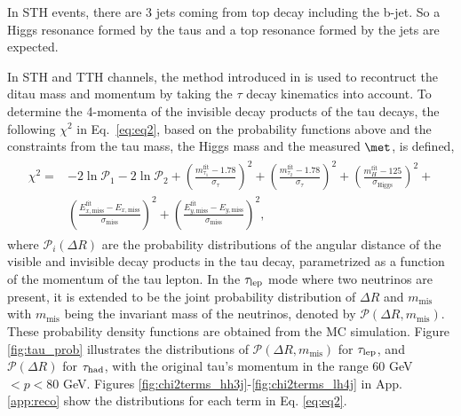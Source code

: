 In STH events, there are 3 jets coming from top decay including the b-jet. So a Higgs resonance formed by the taus and a top resonance formed by the jets are expected.

In STH and TTH channels, the method introduced in \cite{fcnc_PRD} is used to recontruct the ditau mass and momentum by taking the $\tau$ decay kinematics into account. To determine the 4-momenta of the invisible decay products of the tau decays, the following $\chi^2$ in Eq.~\ref{eq:eq2}, based on the probability functions above and the constraints from the tau mass, the Higgs mass and the measured $\met$, is defined,
\begin{eqnarray}
\begin{array}{ll}
\chi^2 = & -2\ln \mathcal{P}_1 -2\ln \mathcal{P}_2 + \left( \frac{m_{\tau_1}^{\text{fit}} - 1.78}{\sigma_{\tau}} \right)^2 +  \left( \frac{m_{\tau_2}^{\text{fit}} - 1.78}{\sigma_{\tau}} \right)^2 +  \left( \frac{m_{H}^{\text{fit}} - 125}{\sigma_{\text{Higgs}}} \right)^2 + \\
 & \left( \frac{E_{x,\text{miss}}^{\text{fit}} - E_{x,\text{miss}}}{\sigma_{\text{miss}}} \right)^2 + \left( \frac{E_{y,\text{miss}}^{\text{fit}} - E_{y,\text{miss}}}{\sigma_{\text{miss}}} \right)^2 ,
\end{array}
\label{eq:eq2}
\end{eqnarray}
where $\mathcal{P}_i(\Delta R)$ are the probability distributions of the angular distance of the visible and invisible decay products in the tau decay, parametrized as a function of the momentum of the tau lepton. In the $\tau_\text{lep}$ mode where two neutrinos are present, it is extended to be the joint probability distribution of $\Delta R$ and $m_{\text{mis}}$ with $m_{\text{mis}}$ being the invariant mass of the neutrinos, denoted by $\mathcal{P}(\Delta R, m_{\text{mis}})$. These probability density functions are obtained from the MC simulation. Figure \ref{fig:tau_prob} illustrates the distributions of $\mathcal{P}(\Delta R, m_{\text{mis}})$ for $\tau_\text{lep}$, and $\mathcal{P}(\Delta R)$ for $\tau_\text{had}$, with the original tau's momentum in the range 60 GeV$<p<80$ GeV. Figures \ref{fig:chi2terms_hh3j}-\ref{fig:chi2terms_lh4j} in App. \ref{app:reco} show the distributions for each term in Eq. \ref{eq:eq2}.



